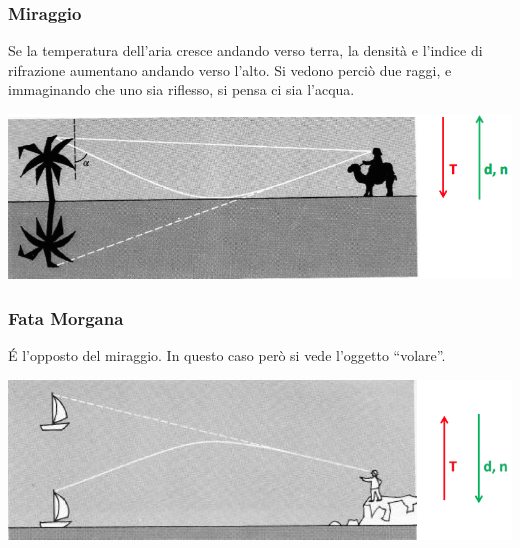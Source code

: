 \subsubsection{Miraggio}
Se la temperatura dell'aria cresce andando verso terra, la densità e l'indice di rifrazione aumentano andando verso l'alto. Si vedono perciò due raggi, e immaginando che uno sia riflesso, si pensa ci sia l'acqua.
\begin{center}
\includegraphics[width=\textwidth]{immagini/miraggio.png}
\end{center}

\subsubsection{Fata Morgana}
\'E l'opposto del miraggio. In questo caso però si vede l'oggetto ``volare''.
\begin{center}
\includegraphics[width=\textwidth]{immagini/morgana.png}
\end{center}

